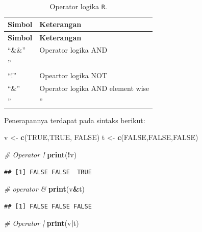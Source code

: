 \documentclass[
]{book}
\newenvironment{Shaded}{\begin{snugshade}}{\end{snugshade}}
\newcommand{\CommentTok}[1]{\textcolor[rgb]{0.56,0.35,0.01}{\textit{#1}}}
\newcommand{\ConstantTok}[1]{\textcolor[rgb]{0.56,0.35,0.01}{#1}}
\newcommand{\FunctionTok}[1]{\textcolor[rgb]{0.13,0.29,0.53}{\textbf{#1}}}
\newcommand{\NormalTok}[1]{#1}
\newcommand{\OtherTok}[1]{\textcolor[rgb]{0.56,0.35,0.01}{#1}}
\newcommand{\SpecialCharTok}[1]{\textcolor[rgb]{0.81,0.36,0.00}{\textbf{#1}}}
\theoremstyle{definition}
\theoremstyle{definition}
\theoremstyle{definition}
\theoremstyle{definition}
\theoremstyle{remark}
\begin{document}
\begin{longtable}[]{@{}ll@{}}
\caption{\label{tab:oplogika} Operator logika \texttt{R}.}\tabularnewline
\toprule\noalign{}
\textbf{Simbol} & \textbf{Keterangan} \\
\midrule\noalign{}
\endfirsthead
\toprule\noalign{}
\textbf{Simbol} & \textbf{Keterangan} \\
\midrule\noalign{}
\endhead
\bottomrule\noalign{}
\endlastfoot
``\&\&'' & Operator logika AND \\
'' & \\
``!'' & Opeartor logika NOT \\
``\&'' & Operator logika AND element wise \\
'' & '' \\
\end{longtable}

Penerapannya terdapat pada sintaks berikut:

\begin{Shaded}
\begin{Highlighting}[]
\NormalTok{v }\OtherTok{\textless{}{-}} \FunctionTok{c}\NormalTok{(}\ConstantTok{TRUE}\NormalTok{,}\ConstantTok{TRUE}\NormalTok{, }\ConstantTok{FALSE}\NormalTok{)}
\NormalTok{t }\OtherTok{\textless{}{-}} \FunctionTok{c}\NormalTok{(}\ConstantTok{FALSE}\NormalTok{,}\ConstantTok{FALSE}\NormalTok{,}\ConstantTok{FALSE}\NormalTok{)}

\CommentTok{\# Operator !}
\FunctionTok{print}\NormalTok{(}\SpecialCharTok{!}\NormalTok{v)}
\end{Highlighting}
\end{Shaded}

\begin{verbatim}
## [1] FALSE FALSE  TRUE
\end{verbatim}

\begin{Shaded}
\begin{Highlighting}[]
\CommentTok{\# operator \&}
\FunctionTok{print}\NormalTok{(v}\SpecialCharTok{\&}\NormalTok{t)}
\end{Highlighting}
\end{Shaded}

\begin{verbatim}
## [1] FALSE FALSE FALSE
\end{verbatim}

\begin{Shaded}
\begin{Highlighting}[]
\CommentTok{\# Operator |}
\FunctionTok{print}\NormalTok{(v}\SpecialCharTok{|}\NormalTok{t)}
\end{Highlighting}
\end{Shaded}
\end{document}
